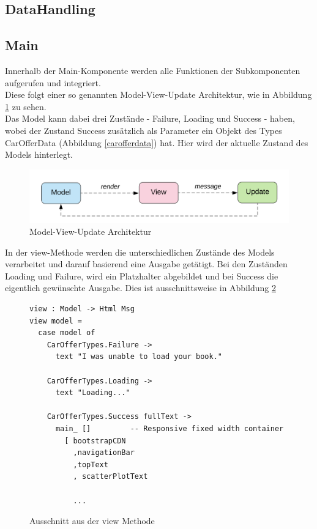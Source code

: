 \subsection{DataHandling}


\subsection{Main}

Innerhalb der Main-Komponente werden alle Funktionen der Subkomponenten aufgerufen und integriert.\\
Diese folgt einer so genannten Model-View-Update Architektur, wie in Abbildung \ref{fig:model-view-update} zu sehen.\\
Das Model kann dabei drei Zustände - Failure, Loading und Success - haben, wobei der Zustand Success zusätzlich als Parameter ein Objekt des Types CarOfferData (Abbildung \ref{carofferdata}) hat. Hier wird der aktuelle Zustand des Models hinterlegt.\\

\begin{figure}[H]
    \centering
    \includegraphics[width=\textwidth]{img/architecture.png}
    \caption{Model-View-Update Architektur}
    \label{fig:model-view-update}
\end{figure}

In der view-Methode werden die unterschiedlichen Zustände des Models verarbeitet und darauf basierend eine Ausgabe getätigt. Bei den Zuständen Loading und Failure, wird ein Platzhalter abgebildet und bei Success die eigentlich gewünschte Ausgabe. Dies ist ausschnittsweise in Abbildung \ref{fig:view-method}

\begin{figure}[H]
    \centering
    \begin{mdframed}[backgroundcolor=black!10]
    \begin{verbatim}
view : Model -> Html Msg
view model =
  case model of
    CarOfferTypes.Failure ->
      text "I was unable to load your book."

    CarOfferTypes.Loading ->
      text "Loading..."

    CarOfferTypes.Success fullText ->
      main_ []         -- Responsive fixed width container
        [ bootstrapCDN
          ,navigationBar
          ,topText
          , scatterPlotText

          ...
    \end{verbatim}
\end{mdframed}
\caption{Ausschnitt aus der view Methode}
\label{fig:view-method}
\end{figure}

